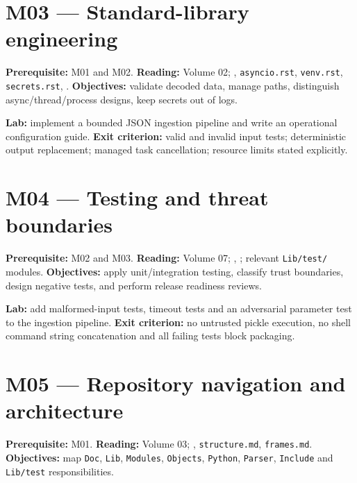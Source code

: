 \documentclass[
  11pt,
]{report}
\newcommand{\passthrough}[1]{#1}
\begin{document}
\section{M03 --- Standard-library
engineering}\label{m03-standard-library-engineering}

\textbf{Prerequisite:} M01 and M02. \textbf{Reading:} Volume 02;
,
\passthrough{\lstinline!asyncio.rst!},
\passthrough{\lstinline!venv.rst!},
\passthrough{\lstinline!secrets.rst!},
. \textbf{Objectives:}
validate decoded data, manage paths, distinguish async/thread/process
designs, keep secrets out of logs.

\textbf{Lab:} implement a bounded JSON ingestion pipeline and write an
operational configuration guide. \textbf{Exit criterion:} valid and
invalid input tests; deterministic output replacement; managed task
cancellation; resource limits stated explicitly.

\section{M04 --- Testing and threat
boundaries}\label{m04-testing-and-threat-boundaries}

\textbf{Prerequisite:} M02 and M03. \textbf{Reading:} Volume 07;
,
; relevant
\passthrough{\lstinline!Lib/test/!} modules. \textbf{Objectives:} apply
unit/integration testing, classify trust boundaries, design negative
tests, and perform release readiness reviews.

\textbf{Lab:} add malformed-input tests, timeout tests and an
adversarial parameter test to the ingestion pipeline. \textbf{Exit
criterion:} no untrusted pickle execution, no shell command string
concatenation and all failing tests block packaging.

\section{M05 --- Repository navigation and
architecture}\label{m05-repository-navigation-and-architecture}

\textbf{Prerequisite:} M01. \textbf{Reading:} Volume 03;
,
\passthrough{\lstinline!structure.md!},
\passthrough{\lstinline!frames.md!}. \textbf{Objectives:} map
\passthrough{\lstinline!Doc!}, \passthrough{\lstinline!Lib!},
\passthrough{\lstinline!Modules!}, \passthrough{\lstinline!Objects!},
\passthrough{\lstinline!Python!}, \passthrough{\lstinline!Parser!},
\passthrough{\lstinline!Include!} and \passthrough{\lstinline!Lib/test!}
responsibilities.
\end{document}
